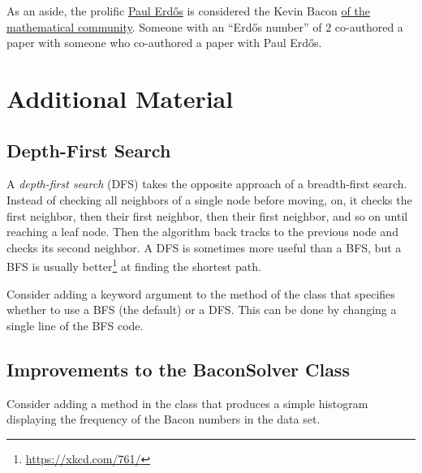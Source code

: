As an aside, the prolific \href{https://en.wikipedia.org/wiki/Erd%C5%91s_number}{Paul Erd\H{o}s} is considered the Kevin Bacon \href{https://xkcd.com/599/}{of the mathematical community}.
Someone with an ``Erd\H{o}s number'' of $2$ co-authored a paper with someone who co-authored a paper with Paul Erd\H{o}s.

\newpage

\section*{Additional Material} %

\subsection*{Depth-First Search} %


A \emph{depth-first search} (DFS) takes the opposite approach of a breadth-first search.
Instead of checking all neighbors of a single node before moving, on, it checks the first neighbor, then their first neighbor, then their first neighbor, and so on until reaching a leaf node.
Then the algorithm back tracks to the previous node and checks its second neighbor.
A DFS is sometimes more useful than a BFS, but a BFS is usually better\footnote{\url{https://xkcd.com/761/}} at finding the shortest path.

Consider adding a keyword argument to the  method of the  class that specifies whether to use a BFS (the default) or a DFS.
This can be done by changing a single line of the BFS code.

\subsection*{Improvements to the BaconSolver Class} %

Consider adding a  method in the  class that produces a simple histogram displaying the frequency of the Bacon numbers in the data set.

